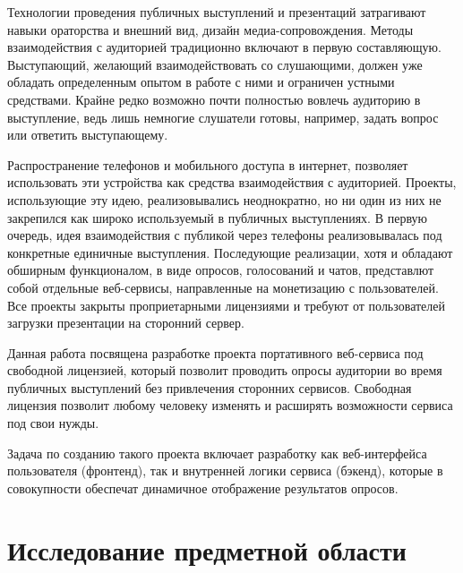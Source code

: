 







\Intro
Технологии проведения публичных выступлений и презентаций затрагивают навыки ораторства и внешний вид, дизайн медиа-сопровождения. Методы взаимодействия с аудиторией традиционно включают в первую составляющую. Выступающий, желающий взаимодействовать со слушающими, должен уже обладать определенным опытом в работе с ними и ограничен устными средствами. Крайне редко возможно почти полностью вовлечь аудиторию в выступление, ведь лишь немногие слушатели готовы, например, задать вопрос или ответить выступающему.


Распространение телефонов и мобильного доступа в интернет, позволяет использовать эти устройства как средства взаимодействия с аудиторией. Проекты, использующие эту идею, реализовывались неоднократно, но ни один из них не закрепился как широко используемый в публичных выступлениях. В первую очередь, идея взаимодействия с публикой через телефоны реализовывалась под конкретные единичные выступления. Последующие реализации, хотя и обладают обширным функционалом, в виде  опросов, голосований и чатов, представлют собой отдельные веб-сервисы, направленные на монетизацию с пользователей. Все проекты закрыты проприетарными лицензиями и требуют от пользователей загрузки презентации на сторонний сервер.

Данная работа посвящена разработке проекта портативного веб-сервиса под свободной лицензией, который позволит проводить опросы аудитории во время публичных выступлений без привлечения сторонних сервисов. Свободная лицензия позволит любому человеку изменять и расширять возможности сервиса под свои нужды.

Задача по созданию такого проекта включает разработку как веб-интерфейса пользователя (фронтенд), так и  внутренней логики сервиса (бэкенд), которые в совокупности обеспечат динамичное отображение результатов опросов.
   
\section{Исследование предметной области}
